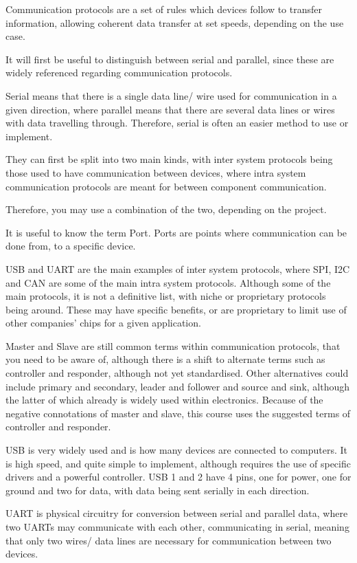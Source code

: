 \documentclass[a4paper,11pt]{report}
\begin{document}
Communication protocols are a set of rules which devices follow to transfer information, allowing coherent data transfer at set speeds, depending on the use case.

It will first be useful to distinguish between serial and parallel, since these are widely referenced regarding communication protocols.

Serial means that there is a single data line/ wire used for communication in a given direction, where parallel means that there are several data lines or wires with data travelling through. Therefore, serial is often an easier method to use or implement.

They can first be split into two main kinds, with inter system protocols being those used to have communication between devices, where intra system communication protocols are meant for between component communication.

Therefore, you may use a combination of the two, depending on the project.

It is useful to know the term Port. Ports are points where communication can be done from, to a specific device.

USB and UART are the main examples of inter system protocols, where SPI, I2C and CAN are some of the main intra system protocols. Although some of the main protocols, it is not a definitive list, with niche or proprietary protocols being around. These may have specific benefits, or are proprietary to limit use of other companies' chips for a given application.

Master and Slave are still common terms within communication protocols, that you need to be aware of, although there is a shift to alternate terms such as controller and responder, although not yet standardised. Other alternatives could include primary and secondary, leader and follower and source and sink, although the latter of which already is widely used within electronics. Because of the negative connotations of master and slave, this course uses the suggested terms of controller and responder.

USB is very widely used and is how many devices are connected to computers. It is high speed, and quite simple to implement, although requires the use of specific drivers and a powerful controller. USB 1 and 2 have 4 pins, one for power, one for ground and two for data, with data being sent serially in each direction.

UART is physical circuitry for conversion between serial and parallel data, where two UARTs may communicate with each other, communicating in serial, meaning that only two wires/ data lines are necessary for communication between two devices.
\end{document}
